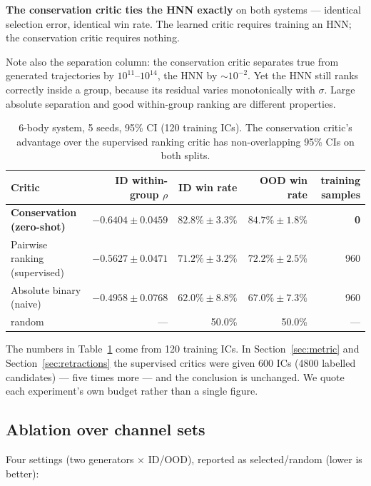 \documentclass[11pt]{article}
\begin{document}
\textbf{The conservation critic ties the HNN exactly} on both systems --- identical
selection error, identical win rate. The learned critic requires training an HNN; the
conservation critic requires nothing.

Note also the separation column: the conservation critic separates true from generated
trajectories by $10^{11}$--$10^{14}$, the HNN by $\sim10^{-2}$. Yet the HNN still ranks
correctly inside a group, because its residual varies monotonically with $\sigma$.
Large absolute separation and good within-group ranking are different properties.

\begin{table}[t]
\centering
\small
\caption{6-body system, 5 seeds, 95\% CI (120 training ICs). The conservation critic's
advantage over the supervised ranking critic has non-overlapping 95\% CIs on both
splits.}
\label{tab:6body}
\begin{tabular}{lrrrr}
\toprule
Critic & ID within-group $\rho$ & ID win rate & OOD win rate & training samples \\
\midrule
\textbf{Conservation (zero-shot)} & $\mathbf{-0.6404\pm0.0459}$ & $\mathbf{82.8\%\pm3.3\%}$ & $\mathbf{84.7\%\pm1.8\%}$ & \textbf{0} \\
Pairwise ranking (supervised) & $-0.5627\pm0.0471$ & $71.2\%\pm3.2\%$ & $72.2\%\pm2.5\%$ & 960 \\
Absolute binary (naive) & $-0.4958\pm0.0768$ & $62.0\%\pm8.8\%$ & $67.0\%\pm7.3\%$ & 960 \\
random & --- & 50.0\% & 50.0\% & --- \\
\bottomrule
\end{tabular}
\end{table}

The numbers in Table~\ref{tab:6body} come from 120 training ICs. In
Section~\ref{sec:metric} and Section~\ref{sec:retractions} the supervised critics were
given 600 ICs (4800 labelled candidates) --- five times more --- and the conclusion is
unchanged. We quote each experiment's own budget rather than a single figure.

\subsection{Ablation over channel sets}
\label{sec:ablation}

Four settings (two generators $\times$ ID/OOD), reported as selected/random (lower is
better):
\end{document}
